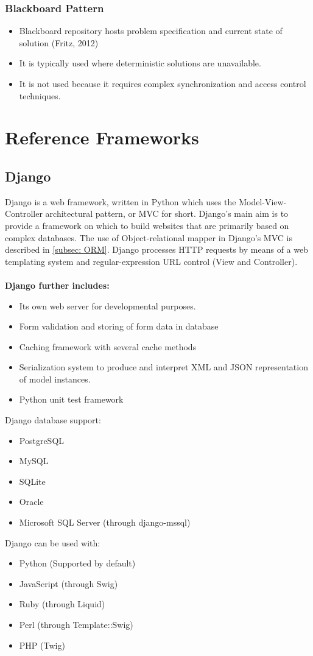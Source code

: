 \documentclass{article}
\begin{document}
\subsubsection{Blackboard Pattern}
\begin{itemize}
\item Blackboard repository hosts problem specification and current state of solution (Fritz, 2012)
\item It is typically used where deterministic solutions are unavailable.
\item It is not used because it requires complex synchronization and access control techniques. 
\end{itemize}

\clearpage
\section{Reference Frameworks}\label{sec: RefFrameworks}


	\subsection{Django}\label{subsec: Django}
	Django is a web framework, written in Python which uses the Model-View-Controller architectural pattern, or MVC for short.
	Django's main aim is to provide a framework on which to build websites that are primarily based on complex databases.
	The use of Object-relational mapper in Django's MVC is described in \ref{subsec: ORM}. Django processes HTTP requests by means of a web templating system and regular-expression URL control (View and Controller).
	\\ \\
	\textbf{Django further includes:}
	\begin{itemize}
		\item Its own web server for developmental purposes.
		\item Form validation and storing of form data in database
		\item Caching framework with several cache methods
		\item Serialization system to produce and interpret XML and JSON representation of model instances.
		\item Python unit test framework
	\end{itemize}
	Django database support:
	\begin{itemize}
		\item PostgreSQL
		\item MySQL
		\item SQLite
		\item Oracle
		\item Microsoft SQL Server (through django-mssql)
	\end{itemize}
	Django can be used with:
	\begin{itemize}
		\item Python (Supported by default)
		\item JavaScript (through Swig)
		\item Ruby (through Liquid)
		\item Perl (through Template::Swig)
		\item PHP (Twig)
	\end{itemize}
\end{document}
